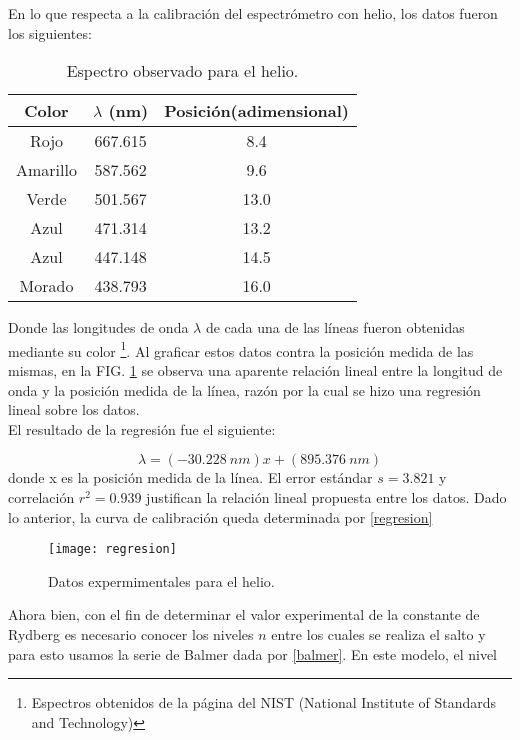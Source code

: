 \documentclass[prb,aps,twocolumn,preprintnumbers,amsmath,amssymb]{revtex4}
\begin{document}
En lo que respecta a la calibración del espectrómetro con helio, los datos fueron los siguientes:

\begin{table}[h!]
	\caption{\label{Tabla 1}Espectro observado para el helio.}
	\begin{ruledtabular}
		\begin{tabular}{ccc}
			Color&$\lambda$ (nm)&Posición(adimensional)\\
			\hline
			Rojo & 667.615 & 8.4\\
			Amarillo & 587.562& 9.6\\
			Verde & 501.567 & 13.0\\
			Azul & 471.314 & 13.2\\
			Azul & 447.148 & 14.5\\
			Morado & 438.793 & 16.0\\
		\end{tabular}
	\end{ruledtabular}
\end{table}

\indent
Donde las longitudes de onda $\lambda$ de cada una de las líneas fueron obtenidas mediante su color \footnote{Espectros obtenidos de la página del NIST (National Institute of Standards and Technology)}. Al graficar  estos datos contra la posición medida de las mismas, en la FIG. \ref{fig:regresion} se observa una aparente relación lineal entre la longitud de onda y la posición medida de la línea, razón por la cual se hizo una regresión lineal sobre los datos. 
\\

El resultado de la regresión fue el siguiente:

\begin{equation}
\label{regresion}
\lambda = (-30.228\ nm)x + (895.376\ nm)
\end{equation}
\noindent
donde x es la posición medida de la línea. El error estándar $s = 3.821$ y correlación $r^2 = 0.939$ justifican la relación lineal propuesta entre los datos. Dado lo anterior, la curva de calibración queda determinada por \eqref{regresion}
\begin{figure}[h!]
	\centering
	\texttt{[image: regresion]}
	\caption{Datos expermimentales para el helio.\label{fig:regresion}}
\end{figure}

Ahora bien, con el fin de determinar el valor experimental de la constante de Rydberg es necesario conocer los niveles $n$ entre los cuales se realiza el salto y para esto usamos la serie de Balmer dada por \eqref{balmer}. En este modelo, el nivel\\
\end{document}
